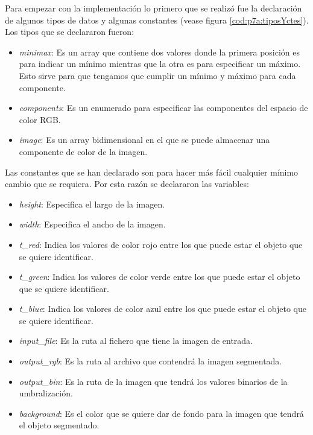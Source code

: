 \documentclass{article}
\begin{document}
	Para empezar con la implementación lo primero que se realizó fue la declaración de algunos tipos de datos y algunas constantes (vease figura \ref{cod:p7a:tiposYctes}). Los tipos que se declararon fueron:
\begin{itemize}
	\item \emph{minimax}: Es un array que contiene dos valores donde la primera posición es para indicar un mínimo mientras que la otra es para especificar un máximo. Esto sirve para que tengamos que cumplir un mínimo y máximo para cada componente.
	\item \emph{components}: Es un enumerado para especificar las componentes del espacio de color RGB.
	\item \emph{image}: Es un array bidimensional en el que se puede almacenar una componente de color de la imagen. 
\end{itemize}
	Las constantes que se han declarado son para hacer más fácil cualquier mínimo cambio que se requiera. Por esta razón se declararon las variables:
\begin{itemize}
	\item \emph{height}: Especifica el largo de la imagen.
	\item \emph{width}: Especifica el ancho de la imagen.
	\item \emph{t\_red}: Indica los valores de color rojo entre los que puede estar el objeto que se quiere identificar.
	\item \emph{t\_green}: Indica los valores de color verde entre los que puede estar el objeto que se quiere identificar.
	\item \emph{t\_blue}: Indica los valores de color azul entre los que puede estar el objeto que se quiere identificar.
	\item \emph{input\_file}: Es la ruta al fichero que tiene la imagen de entrada.
	\item \emph{output\_rgb}: Es la ruta al archivo que contendrá la imagen segmentada.
	\item \emph{output\_bin}: Es la ruta de la imagen que tendrá los valores binarios de la umbralización.
	\item \emph{background}: Es el color que se quiere dar de fondo para la imagen que tendrá el objeto segmentado.
\end{itemize}
\end{document}
